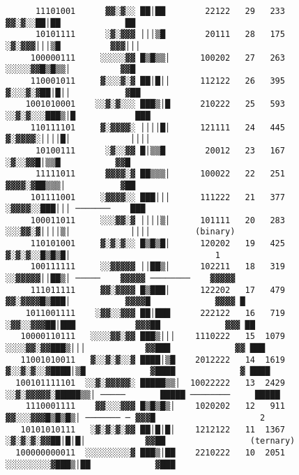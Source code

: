 \documentclass[12pt]{article}
\theoremstyle{plain}
\theoremstyle{definition}
\begin{document}
\begin{lstlisting}
      11101001      ▓▓░▓░░ ██│██        22122   29   233                            ▓▓░▓░░██│██             ██                            
      10101111      ░▓░▓▓▓ │││▒█        20111   28   175                           ░▓░▓▓▓│││▒█          ▓▓▓│││                             
     100000111     ░░░░░▓▓ █▒█▒▒│      100202   27   263                         ░░░░░▓▓█▒█▒▒│          ▓▓█                                 
     110001011     ▓░░░▓░▓ ██│█││      112122   26   395                        ▓░░░▓░▓██│█││           ▓██                                 
    1001010001    ░░▓░▓░░░ ███▒│█      210222   25   593                      ░░▓░▓░░░███▒│█            ███                                 
     110111101     ▓░▓▓▓▓░ ││││█│      121111   24   445                      ▓░▓▓▓▓░││││█│            ││││                                 
      10100111      ░▓░░▓▓ █│▒▒█        20012   23   167                      ░▓░░▓▓█│▒▒█           ▓▓█                                       
      11111011      ▓▓▓▓░▓ ██▒▒▒│      100022   22   251                     ▓▓▓▓░▓██▒▒▒│           ▓██                                       
     101111001     ░▓▓▓▓░░ ███│││      111222   21   377                   ░▓▓▓▓░░███│││ ───────    ███                                   
     100011011     ░░░▓▓░▓ ││││▒│      101111   20   283                  ░░░▓▓░▓││││▒│            ││││         (binary)    
     110101001     ▓░▓░▓░░ █▒█▒█│      120202   19   425                 ▓░▓░▓░░█▒█▒█│                             1                  
     100111111     ░░▓▓▓▓▓ ││██▒│      102211   18   319                ░░▓▓▓▓▓││██▒│ ─────    ▓▓▓▓▓ ────────    ▓▓▓▓▓      
     111011111     ▓▓░▓▓▓▓ █▒███│      122202   17   479               ▓▓░▓▓▓▓█▒███│           ▓▓▓▓█             ▓▓▓▓ █     
    1011001111    ░▓▓░░▓▓▓ ██│███      222122   16   719             ░▓▓░░▓▓▓██│███            ▓▓▓██             ▓▓▓ ██     
   10000110111   ░░░░▓▓░▓▓ ███▒│││    1110222   15  1079           ░░░░▓▓░▓▓███▒│││            ▓▓███             ▓▓ ███     
   11001010011   ▓░░▓░▓░░▓ ████│▒█    2012222   14  1619          ▓░░▓░▓░░▓████│▒█             ▓████             ▓ ████     
  100101111101  ░░▓░▓▓▓▓▓░ █████▒▒│  10022222   13  2429        ░░▓░▓▓▓▓▓░█████▒▒│ ─────       █████ ────────     █████     
    1110001111    ▓▓░░░▓▓▓ █▒█▒█▒│    1020202   12   911         ▓▓░░░▓▓▓█▒█▒█▒│ ─────── ─ ▓▓▓█                     2       
   10101010111   ░▓░▓░▓░▓▓ ██│█│█│    1212122   11  1367       ░▓░▓░▓░▓▓██│█│█│            ▓▓██                 (ternary)   
  100000000011  ░░░░░░░░░▓ ███▒│██    2210222   10  2051     ░░░░░░░░░▓███▒│██             ▓███               

\end{lstlisting}
\end{document}

